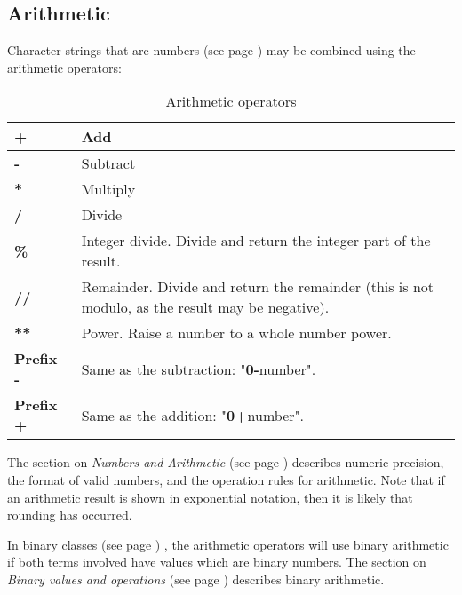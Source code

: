 \subsection{Arithmetic}
\index{,}
\index{,}
\index{,}
\index{,}
Character strings that are  numbers (see page \pageref{refnumdef}) 
may be combined using the arithmetic operators:
\begin{table}\caption{Arithmetic operators}
\begin{tabularx}{\textwidth}{>{\bfseries}lX}
\toprule
+&Add
\\\midrule
-&Subtract
\\\midrule
*&Multiply
\\\midrule
/&Divide
\\\midrule
\%&Integer divide. Divide and return the integer part of the result.
\\\midrule
//&Remainder. Divide and return the remainder (this is not modulo, as the result
may be negative).
\\\midrule
**&Power. Raise a number to a whole number power.
\\\midrule
Prefix -&Same as the subtraction: "\textbf{0-}number".
\\\midrule
Prefix +&Same as the addition: "\textbf{0+}number".
\\\bottomrule
\end{tabularx}
\end{table}
The section on  \emph{Numbers and Arithmetic} (see page \pageref{refnums}) 
describes numeric precision, the format of valid numbers, and the
operation rules for arithmetic.  Note that if an arithmetic result is
shown in exponential notation, then it is likely that rounding has
occurred.
 
In  binary classes (see page \pageref{refbincla}) , the arithmetic operators will use
binary arithmetic if both terms involved have values which are binary
numbers.
The section on  \emph{Binary values and operations} (see page \pageref{refbinary}) 
describes binary arithmetic.
